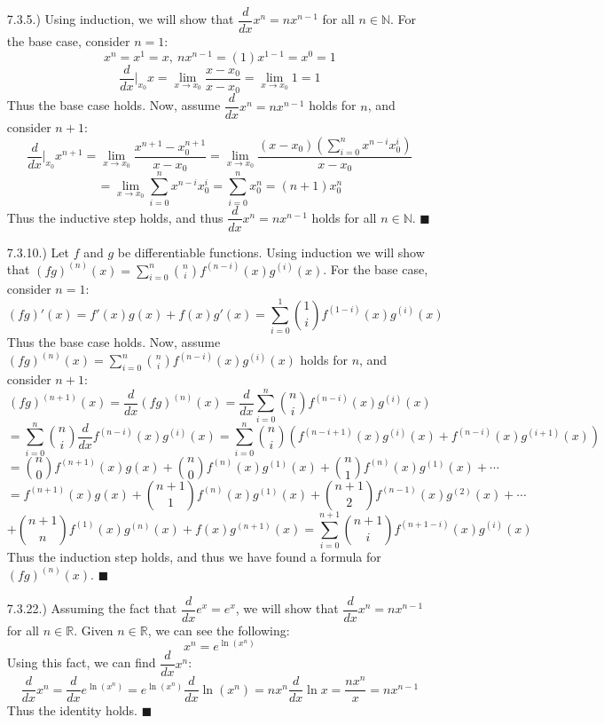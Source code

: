 \documentclass[12pt]{article}
\newcommand{\parens}[1]{\left(#1\right)}             %
\newcommand{\N}{\mathbb{N}}
\newcommand{\R}{\mathbb{R}}
\newcommand{\derv}[2]{\dfrac{d#1}{d#2}}
\newcommand{\lm}[1]{\displaystyle\lim_{#1}}
\begin{document}
\pagestyle{fancy}
\fancyhead{}

\normalsize

\begin{itemize}
    \item [7.3.5.)] Using induction, we will show that $\derv{}{x}x^n=nx^{n-1}$ for all $n\in\N$. For the base case, consider $n=1$:
    \[x^n=x^1=x,\ nx^{n-1}=(1)x^{1-1}=x^0=1\]
    \[\derv{}{x}\bigg\vert_{x_0}x=\lm{x\to x_0}\frac{x-x_0}{x-x_0}=\lm{x\to x_0}1=1\]
    Thus the base case holds. Now, assume $\derv{}{x}x^n=nx^{n-1}$ holds for $n$, and consider $n+1$:
    \[\derv{}{x}\bigg\vert_{x_0}x^{n+1}=\lm{x\to x_0}\frac{x^{n+1}-x_0^{n+1}}{x-x_0}=\lm{x\to x_0}\frac{(x-x_0)\displaystyle\parens{\sum_{i=0}^{n}x^{n-i}x_0^i}}{x-x_0}\]
    \[=\lm{x\to x_0}\sum_{i=0}^{n}x^{n-i}x_0^i=\sum_{i=0}^nx_0^n=(n+1)x_0^n\]
    Thus the inductive step holds, and thus $\derv{}{x}x^n=nx^{n-1}$ holds for all $n\in\N$. $\blacksquare$

    \item [7.3.10.)] Let $f$ and $g$ be differentiable functions. Using induction we will show that $(fg)^{(n)}(x)=\displaystyle\sum_{i=0}^n\binom{n}{i}f^{(n-i)}(x)g^{(i)}(x)$. For the base case, consider $n=1$:
    \[(fg)'(x)=f'(x)g(x)+f(x)g'(x)=\sum_{i=0}^1\binom{1}{i}f^{(1-i)}(x)g^{(i)}(x)\]
    Thus the base case holds. Now, assume $(fg)^{(n)}(x)=\displaystyle\sum_{i=0}^n\binom{n}{i}f^{(n-i)}(x)g^{(i)}(x)$ holds for $n$, and consider $n+1$:
    \[(fg)^{(n+1)}(x)=\derv{}{x}(fg)^{(n)}(x)=\derv{}{x}\sum_{i=0}^n\binom{n}{i}f^{(n-i)}(x)g^{(i)}(x)\]
    \[=\sum_{i=0}^n\binom{n}{i}\derv{}{x}f^{(n-i)}(x)g^{(i)}(x)=\sum_{i=0}^n\binom{n}{i}\parens{f^{(n-i+1)}(x)g^{(i)}(x)+f^{(n-i)}(x)g^{(i+1)}(x)}\]
    \[=\binom{n}{0}f^{(n+1)}(x)g(x)+\binom{n}{0}f^{(n)}(x)g^{(1)}(x)+\binom{n}{1}f^{(n)}(x)g^{(1)}(x)+\cdots\]
    \[=f^{(n+1)}(x)g(x)+\binom{n+1}{1}f^{(n)}(x)g^{(1)}(x)+\binom{n+1}{2}f^{(n-1)}(x)g^{(2)}(x)+\cdots\]
    \[+\binom{n+1}{n}f^{(1)}(x)g^{(n)}(x)+f(x)g^{(n+1)}(x)=\sum_{i=0}^{n+1}\binom{n+1}{i}f^{(n+1-i)}(x)g^{(i)}(x)\]
    Thus the induction step holds, and thus we have found a formula for $(fg)^{(n)}(x)$. $\blacksquare$

    \pagebreak
    \item [7.3.22.)] Assuming the fact that $\derv{}{x}e^x=e^x$, we will show that $\derv{}{x}x^n=nx^{n-1}$ for all $n\in\R$. Given $n\in\R$, we can see the following:
    \[x^n=e^{\ln\parens{x^n}}\]
    Using this fact, we can find $\derv{}{x}x^n$:
    \[\derv{}{x}x^n=\derv{}{x}e^{\ln\parens{x^n}}=e^{\ln\parens{x^n}}\derv{}{x}\ln\parens{x^n}=nx^n\derv{}{x}\ln x=\frac{nx^n}{x}=nx^{n-1}\]
    Thus the identity holds. $\blacksquare$
\end{itemize}
\end{document}
